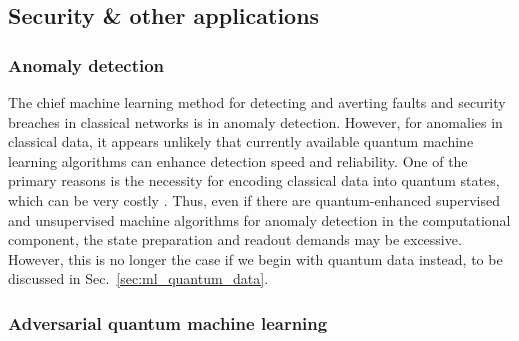 \documentclass[twocolumn, aps, rmp, amsmath, amssymb, nofootinbib, superscriptaddress, longbibliography, floatfix, table-of-contents, eqsecnum]{revtex4}
\begin{document}



\subsection{Security \& other applications}

\subsubsection{Anomaly detection}

The chief machine learning method for detecting and averting faults and security breaches in classical networks is in anomaly detection. However, for anomalies in classical data, it appears unlikely that currently available quantum machine learning algorithms can enhance detection speed and reliability. One of the primary reasons is the necessity for encoding classical data into quantum states, which can be very costly \cite{bib:aaronson2015read}. Thus, even if there are quantum-enhanced supervised and unsupervised machine algorithms for anomaly detection in the computational component, the state preparation and readout demands may be excessive. However, this is no longer the case if we begin with quantum data instead, to be discussed in Sec.~\ref{sec:ml_quantum_data}.

\subsubsection{Adversarial quantum machine learning}
\end{document}
